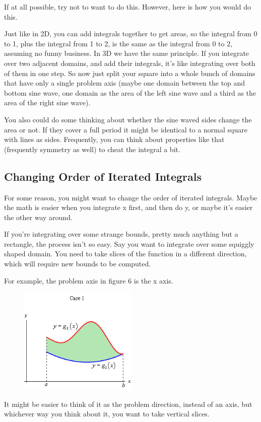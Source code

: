 \documentclass[12pt, letterpaper]{article}
\begin{document}
If at all possible, try not to want to do this. However, here is how you would do this.

Just like in 2D, you can add integrals together to get areas,
so the integral from 0 to 1, plus the integral from 1 to 2, is the same as the integral from 0 to 2, assuming no funny business.
In 3D we have the same principle. If you integrate over two adjacent domains, and add their integrals, it's like integrating over both of them in one step.
So now just split your square into a whole bunch of domains that have only a single problem axis (maybe one domain between the top and bottom sine wave, one domain as the area of the left sine wave and a third as the area of the right sine wave).

You also could do some thinking about whether the sine waved sides change the area or not.
If they cover a full period it might be identical to a normal square with lines as sides.
Frequently, you can think about properties like that (frequently symmetry as well) to cheat the integral a bit.

\subsection{Changing Order of Iterated Integrals}
For some reason, you might want to change the order of iterated integrals. 
Maybe the math is easier when you integrate x first, and then do y, or maybe it's easier the other way around.

If you're integrating over some strange bounds, pretty much anything but a rectangle, the process isn't so easy.
Say you want to integrate over some squiggly shaped domain.
You need to take slices of the function in a different direction, which will require new bounds to be computed.

For example, the problem axis in figure 6 is the x axis.
\begin{figure}[h]
    \centering 
    \includegraphics[width=0.5\textwidth]{problemaxis}
    \caption{}
\end{figure}
It might be easier to think of it as the problem direction, instead of an axis, but whichever way you think about it, you want to take vertical slices.
\end{document}
